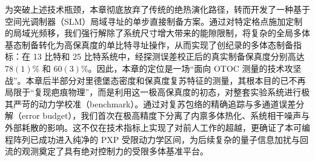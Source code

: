 \documentclass[../main.tex]{subfiles}
\begin{document}
为突破上述技术瓶颈，本章彻底放弃了传统的绝热演化路径，转而开发了一种基于空间光调制器（SLM）局域寻址的单步直接制备方案。通过对特定格点施加定制的局域光频移，我们强行解除了系统尺寸增大带来的能隙限制，将复杂的全局多体基态制备转化为高保真度的单比特寻址操作，从而实现了创纪录的多体态制备指标：在 13 比特和 25 比特系统中，经探测误差校正后的真实制备保真度分别高达 $78(1)\%$ 和 $60(3)\%$。因此，本章的定位是一场“面向 OTOC 测量的技术攻坚战”。本章后半部分对里德堡态密度和保真度复苏特征的测量，其根本目的已不再局限于“复现疤痕物理”，而是利用这一极高保真度的初态，对整套实验系统进行极其严苛的动力学校准（benchmark）。通过对复苏包络的精确追踪与多通道误差分解（error budget），我们首次在极高精度下分离了内禀多体热化、系统相干噪声与外部耗散的影响。这不仅在技术指标上实现了对前人工作的超越，更确证了本可编程阵列已成功进入纯净的 PXP 受限动力学区间，为后续复杂的量子信息加扰与回流的观测奠定了具有绝对控制力的受限多体基准平台。




\end{document}
